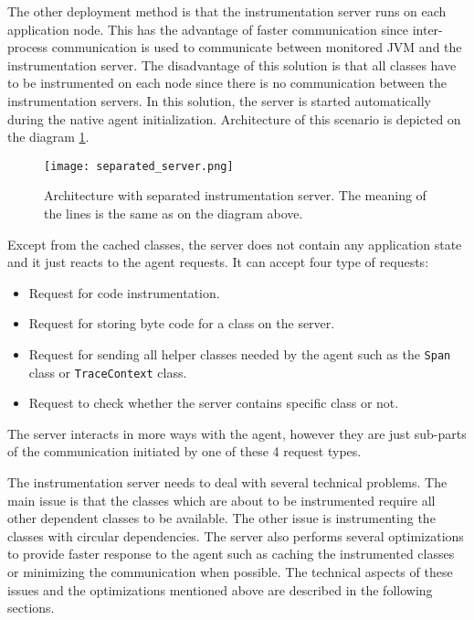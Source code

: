  The other deployment method is that the instrumentation server runs on each application node. This has the advantage of faster communication since  inter-process communication is used to communicate between monitored JVM and the instrumentation server. The disadvantage of this solution is that all classes have to be instrumented on each node since there is no communication between the instrumentation servers. In this solution, the server is started automatically during the native agent initialization. Architecture of this scenario is depicted on the diagram \ref{fig:separated_server}.
 
 \begin{figure}
 	\centering
 	\texttt{[image: separated\_server.png]}
 	\caption{Architecture with separated instrumentation server. The meaning of the lines is the same as on the diagram above.}
 	\label{fig:separated_server}
 \end{figure}

Except from the cached classes, the server does not contain any application state and it just reacts to the agent requests. It can accept four type of requests:
\begin{itemize}
	\item Request for code instrumentation.
	\item Request for storing byte code for a class on the server.
	\item Request for sending all helper classes needed by the agent such as the \texttt{Span} class or \texttt{TraceContext} class.
	\item Request to check whether the server contains specific class or not.
\end{itemize}
The server interacts in more ways with the agent, however they are just sub-parts of the communication initiated by one of these 4 request types.	

The instrumentation server needs to deal with several technical problems. The main issue is that the classes which are about to be instrumented require all other dependent classes to be available. The other issue is instrumenting the classes with circular dependencies. The server also performs several optimizations to provide faster response to the agent such as caching the instrumented classes or minimizing the communication when possible. The technical aspects of these issues and the optimizations mentioned above are described in the following sections.

